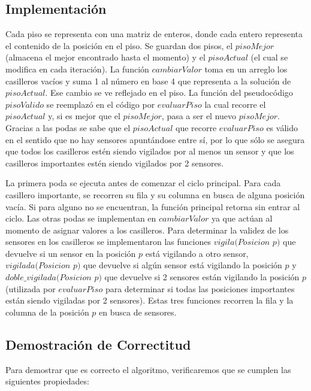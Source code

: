 {\subsection{Implementaci\'on}
\par{Cada piso se representa con una matriz de enteros, donde cada entero representa el contenido de la posici\'on en el piso. Se guardan dos pisos, el $pisoMejor$ (almacena el mejor encontrado hasta el momento) y el $pisoActual$ (el cual se modifica en cada iteraci\'on). La funci\'on $cambiarValor$ toma en un arreglo los casilleros vac\'ios y suma 1 al n\'umero en base 4 que representa a la soluci\'on de $pisoActual$. Ese cambio se ve reflejado en el piso. La funci\'on del pseudoc\'odigo $pisoValido$ se reemplaz\'o en el c\'odigo por $evaluarPiso$ la cual recorre el $pisoActual$ y, si es mejor que el $pisoMejor$, pasa a ser el nuevo $pisoMejor$. Gracias a las podas se sabe que el $pisoActual$ que recorre $evaluarPiso$ es v\'alido en el sentido que no hay sensores apunt\'andose entre s\'i, por lo que s\'olo se asegura que todos los casilleros est\'en siendo vigilados por al menos un sensor y que los casilleros importantes est\'en siendo vigilados por 2 sensores.}
\medskip
\par{La primera poda se ejecuta antes de comenzar el ciclo principal. Para cada casillero importante, se recorren su fila y su columna en busca de alguna posici\'on vac\'ia. Si para alguno no se encuentran, la funci\'on principal retorna sin entrar al ciclo. Las otras podas se implementan en $cambiarValor$ ya que act\'uan al momento de asignar valores a los casilleros. Para determinar la validez de los sensores en los casilleros se implementaron las funciones $vigila(Posicion$ $p)$ que devuelve si un sensor en la posici\'on $p$ est\'a vigilando a otro sensor, $vigilada(Posicion$ $p)$ que devuelve si alg\'un sensor est\'a vigilando la posici\'on $p$ y $doble\_vigilada(Posicion$ $p)$ que devuelve si 2 sensores est\'an vigilando la posici\'on $p$ (utilizada por $evaluarPiso$ para determinar si todas las posiciones importantes est\'an siendo vigiladas por 2 sensores). Estas tres funciones recorren la fila y la columna de la posici\'on $p$ en busca de sensores.}

\newpage
\subsection{Demostraci\'on de Correctitud}
\par{
Para demostrar que es correcto el algoritmo, verificaremos que se cumplen las siguientes propiedades:

}}

